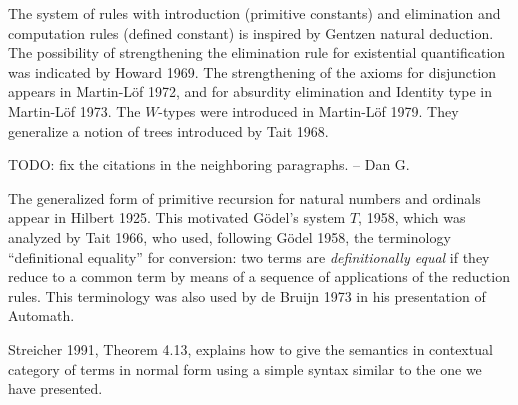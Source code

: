 {%

 The system of rules with introduction (primitive constants) and elimination and computation rules
(defined constant) is inspired by Gentzen natural deduction. The possibility of strengthening
the elimination rule for existential quantification was indicated by Howard 1969. The strengthening of
the axioms for disjunction appears in Martin-L\"of 1972, and for absurdity elimination and Identity type
in Martin-L\"of 1973. The $W$-types were introduced in Martin-L\"of 1979. They generalize a notion
of trees introduced by Tait 1968.%

TODO: fix the citations in the neighboring paragraphs. -- Dan G.

 The generalized form of primitive recursion for natural numbers and ordinals appear in Hilbert 1925.
This motivated G\"odel's system $T$, 1958, which was analyzed by Tait 1966, who used, following
G\"odel 1958, the terminology
``definitional equality'' for conversion: two terms are {\em definitionally equal} if they reduce
to a common term by means of a sequence of applications of the reduction rules. This terminology was
also used by de Bruijn 1973 in his presentation of Automath.

 Streicher 1991, Theorem 4.13, explains how to give the semantics in contextual category of terms in normal
form using a simple syntax similar to the one we have presented.

}
%  


